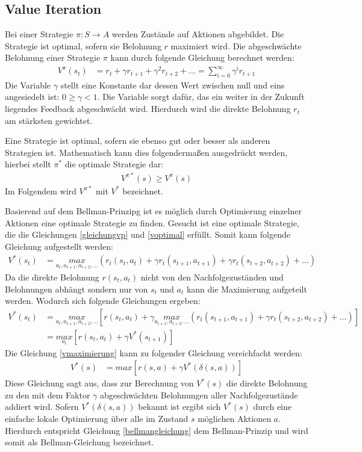 \documentclass[10pt]{scrartcl}
\begin{document}
\subsection{Value Iteration}
Bei einer Strategie $\pi : S \rightarrow A $ werden Zustände auf Aktionen abgebildet. Die Strategie ist optimal, sofern sie Belohnung $r$ maximiert wird. Die abgeschwächte Belohnung einer Strategie $\pi$ kann durch folgende Gleichung berechnet werden:
\begin{align}\label{gleichungvp}
V^{\pi}(s_t) &= r_t + \gamma r_{t+1} + \gamma^2r_{t+2} + ... = \sum^{\infty}_{i=0} \gamma^ir_{t+1}
\end{align}
Die Variable $\gamma$ stellt eine Konstante dar dessen Wert zwischen null und eins angesiedelt ist: $0 \geq \gamma < 1$. Die Variable sorgt dafür, das ein weiter in der Zukunft liegendes Feedback abgeschwächt wird. Hierdurch wird die direkte Belohnung $r_t$ am stärksten gewichtet.

Eine Strategie ist optimal, sofern sie ebenso gut oder besser als anderen Strategien ist. 
Mathematisch kann dies folgendermaßen ausgedrückt werden, hierbei stellt $\pi^*$ die optimale Strategie dar:
\begin{align}\label{voptimal}
V^{\pi*}(s)\geq V^\pi(s)
\end{align}
Im Folgendem wird $V^{\pi*}$ mit $V^*$ bezeichnet.

Basierend auf dem Bellman-Prinzipg ist es möglich durch Optimierung einzelner Aktionen eine optimale Strategie zu finden. Gesucht ist eine optimale Strategie, die die Gleichungen \ref{gleichungvp} und \ref{voptimal} erfüllt. Somit kann folgende Gleichung aufgestellt werden:
\begin{align}
V^*(s_t) &= \underset{a_t,a_{t+1}, a_{t+2},...}{max}(r_t(s_t,a_t) + \gamma r_t(s_{t+1},a_{t+1}) + \gamma r_t(s_{t+2},a_{t+2}) + ...)
\end{align}
Da die direkte Belohnung $r(s_t, a_t)$ nicht von den Nachfolgezuständen und Belohnungen abhängt sondern nur  von $s_t$ und $a_t$ kann die Maximierung aufgeteilt werden. Wodurch sich folgende Gleichungen ergeben:
\begin{align}
V^*(s_t) &= \underset{a_t,a_{t+1}, a_{t+2},...}{max}[r(s_t, a_t) + \gamma \underset{a_{t+1},a_{t+2},...}{max}(r_t(s_{t+1},a_{t+1}) + \gamma r_t(s_{t+2},a_{t+2}) + ...)]\\
&= \underset{a_t}{max}[r(s_t, a_t)+\gamma V^*(s_{t+1})]\label{vmaximierung}
\end{align}
Die Gleichung \ref{vmaximierung} kann zu folgender Gleichung  vereichfacht werden:
\begin{align}\label{bellmangleichung}
V^*(s) &= max[r(s,a) + \gamma V^*(\delta(s,a))]
\end{align}
Diese Gleichung sagt aus, dass zur Berechnung von $V^*(s)$ die direkte Belohnung zu den mit dem Faktor $\gamma$ abgeschwächten Belohnungen aller Nachfolgezustände addiert wird. Sofern $V^*(\delta(s,a))$ bekannt ist ergibt sich $V^*(s)$ durch eine einfache lokale Optimierung über alle im Zustand $s$ möglichen Aktionen $a$. Hierdurch entspricht Gleichung \ref{bellmangleichung} dem Bellman-Prinzip und wird somit als Bellman-Gleichung bezeichnet.
\end{document}
